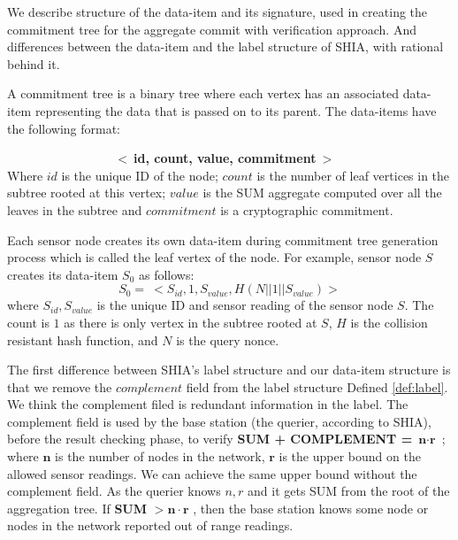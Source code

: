 	We describe structure of the data-item and its signature, used in creating the commitment tree for the aggregate commit with verification approach. And differences between the data-item and the label structure of SHIA, with rational behind it.
	\begin{definition}
		\label{def:data-item}
		A commitment tree is a binary tree where each vertex has an associated data-item representing the data that is passed on to its parent. The data-items have the following format:

		$\hspace{100pt}$ \textbf{$<\ $id, count, value, commitment$\ >$}\\
	Where $id$ is the unique ID of the node; $count$ is the number of leaf vertices in the subtree rooted at this vertex; $value$ is the SUM aggregate computed over all the leaves in the subtree and $commitment$ is a cryptographic commitment.
	\end{definition}
	Each sensor node creates its own data-item during commitment tree generation process which is called the leaf vertex of the node.
	For example, sensor node $S$ creates its data-item $S_{0}$ as follows:
	\begin{equation}
		\label{eq:data-item}
	 	S_{0} =\ <S_{id}, 1, S_{value}, H(N||1||S_{value})>
	 \end{equation}
	where $S_{id}, S_{value}$ is the unique ID and sensor reading of the sensor node $S$. 
	The count is $1$ as there is only vertex in the subtree rooted at $S$, $H$ is the collision resistant hash function, and $N$ is the query nonce.

	The first difference between SHIA's label structure and our data-item structure is that we remove the $complement$ field from the label structure Defined \ref{def:label}. 
	We think the complement filed is redundant information in the label. 
	The complement field is used by the base station (the querier, according to SHIA), before the result checking phase, to verify \textbf{SUM + COMPLEMENT =} $\textbf{n} \cdot \textbf{r}$ ; where $\textbf{n}$ is the number of nodes in the network, $\textbf{r}$ is the upper bound on the allowed sensor readings.
	We can achieve the same upper bound without the complement field.
	As the querier knows $n, r$ and it gets SUM from the root of the aggregation tree.
	If \textbf{SUM} $> \textbf{n} \cdot \textbf{r}$ , then the base station knows some node or nodes in the network reported out of range readings.

